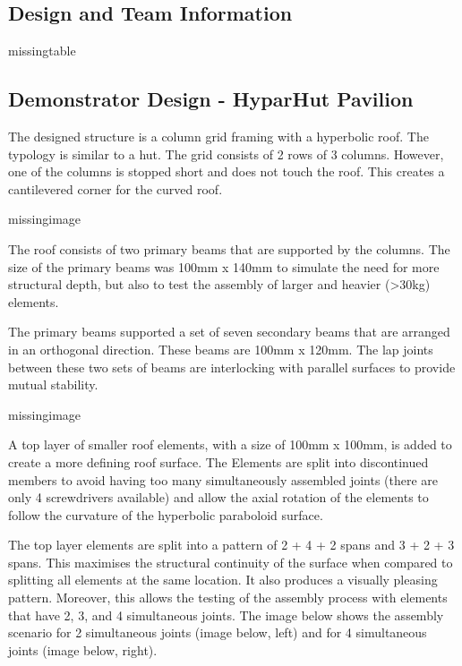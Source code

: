 \subsection{Design and Team Information}
\label{subsection:exploration_4_design_and_team_information}

missingtable

\subsection{Demonstrator Design  - HyparHut Pavilion}
\label{subsection:exploration_4_demonstrator_design_hyparhut_pavilion}

The designed structure is a column grid framing with a hyperbolic roof. The typology is similar to a hut. The grid consists of 2 rows of 3 columns. However, one of the columns is stopped short and does not touch the roof. This creates a cantilevered corner for the curved roof.

missingimage

The roof consists of two primary beams that are supported by the columns. The size of the primary beams was 100mm x 140mm to simulate the need for more structural depth, but also to test the assembly of larger and heavier (>30kg) elements.

The primary beams supported a set of seven secondary beams that are arranged in an orthogonal direction. These beams are 100mm x 120mm. The lap joints between these two sets of beams are interlocking with parallel surfaces to provide mutual stability. 

missingimage

A top layer of smaller roof elements, with a size of 100mm x 100mm, is added to create a more defining roof surface. The Elements are split into discontinued members to avoid having too many simultaneously assembled joints (there are only 4 screwdrivers available) and allow the axial rotation of the elements to follow the curvature of the hyperbolic paraboloid surface. 

The top layer elements are split into a pattern of 2 + 4 + 2 spans and 3 + 2 + 3 spans. This maximises the structural continuity of the surface when compared to splitting all elements at the same location. It also produces a visually pleasing pattern. Moreover, this allows the testing of the assembly process with elements that have 2, 3, and 4 simultaneous joints. The image below shows the assembly scenario for 2 simultaneous joints (image below, left) and for 4 simultaneous joints (image below, right).

